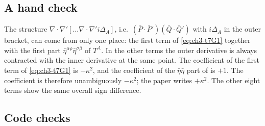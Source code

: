 \subsection{A hand check \tC}

The structure $\nabla\!\cdot\!\nabla'[\ldots\nabla\!\cdot\!\nabla'i\Delta_A]$, i.e.\ $(\bar P\!\cdot\!\bar P')(\bar Q\!\cdot\!\bar Q')$ with $i\Delta_A$ in the outer bracket,
can come from only one place: the first term of \eqref{eq:ch3-t7G1} together with the first part $\bar\eta^{\alpha\rho}\bar\eta^{\sigma\beta}$ of $T^A$. In the
other terms the outer derivative is always contracted with the inner derivative at the same point. The coefficient of the first term of
\eqref{eq:ch3-t7G1} is $-\kappa^2$, and the coefficient of the $\bar\eta\bar\eta$ part of  is $+1$. The coefficient is therefore unambiguously $-\kappa^2$;
the paper writes $+\kappa^2$. The other eight terms show the same overall sign difference.

\subsection{Code checks \tC}
\label{sec:ch3-t7-code}

